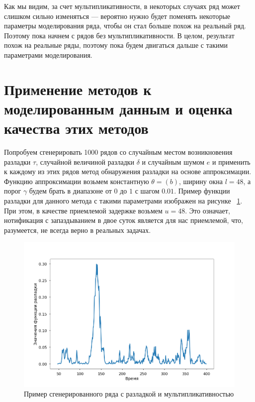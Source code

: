 \documentclass[%
12pt,
master,  %
natbib,      %
subf,        %
substylefile = spbu.rtx,
href,        %
colorlinks,  %
]{disser}
\begin{document}
Как мы видим, за счет мультипликативности, в некоторых случаях ряд может слишком сильно изменяться --- вероятно нужно будет поменять некоторые параметры моделирования ряда, чтобы он стал больше похож на реальный ряд. Поэтому пока начнем с рядов без мультипликативности. В целом, результат похож на реальные ряды, поэтому пока будем двигаться дальше с такими параметрами моделирования.



\section{Применение методов к моделированным данным и оценка качества этих методов}

Попробуем сгенерировать 1000 рядов со случайным местом возникновения разладки $\tau$, случайной величиной разладки $\delta$ и случайным шумом $e$ и применить к каждому из этих рядов метод обнаружения разладки на основе аппроксимации. Функцию аппроксимации возьмем константную $\theta = (b)$, ширину окна $l = 48$, а порог $\gamma$ будем брать в диапазоне от $0$ до $1$ с шагом $0.01$. Пример функции разладки для данного метода с такими параметрами изображен на рисунке  ~\ref{fig:approximation_mean_1}. При этом, в качестве приемлемой задержке возьмем $u = 48$. Это означает, нотификация с запаздыванием в двое суток является для нас приемлемой, что, разумеется, не всегда верно в реальных задачах.

\begin{figure}[!hhh]
	\begin{center}
		\includegraphics[width=12cm]{approximation_mean_1}
	\end{center}
	\vspace{-5mm}\caption{Пример сгенерированного ряда с разладкой и мультипликативностью}
	\label{fig:approximation_mean_1}
\end{figure}
\end{document}
